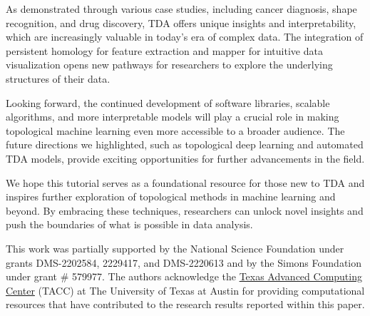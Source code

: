 \documentclass[manuscript,screen]{acmart}
\begin{document}
As demonstrated through various case studies, including cancer diagnosis, shape recognition, and drug discovery, TDA offers unique insights and interpretability, which are increasingly valuable in today's era of complex data. The integration of persistent homology for feature extraction and mapper for intuitive data visualization opens new pathways for researchers to explore the underlying structures of their data.

Looking forward, the continued development of software libraries, scalable algorithms, and more interpretable models will play a crucial role in making topological machine learning even more accessible to a broader audience. The future directions we highlighted, such as topological deep learning and automated TDA models, provide exciting opportunities for further advancements in the field.

We hope this tutorial serves as a foundational resource for those new to TDA and inspires further exploration of topological methods in machine learning and beyond. By embracing these techniques, researchers can unlock novel insights and push the boundaries of what is possible in data analysis.

\begin{acks}
This work was partially supported by the National Science Foundation under grants  DMS-2202584, 2229417, and DMS-2220613 and by the Simons Foundation under grant \# 579977.
The authors acknowledge the \href{http://www.tacc.utexas.edu}{Texas Advanced Computing Center} (TACC) at The University of Texas at Austin for providing computational resources that have contributed to the research results reported within this paper. 
\end{acks}




\clearpage

\appendix





 
\end{document}
